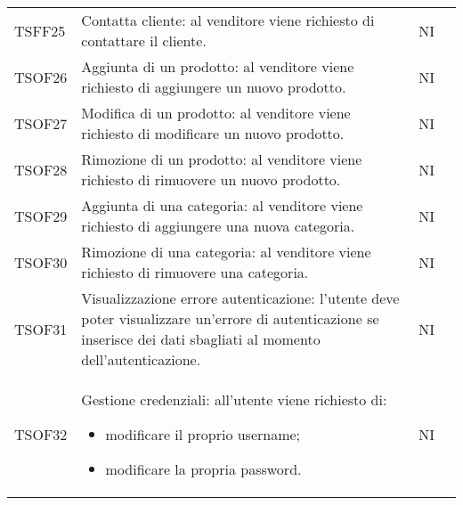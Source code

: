 \begin{center}
\begin{longtable}[!h]{p{50px} p{245px} p{75px} p{50px}}
        TSFF25                           & Contatta cliente: al venditore viene richiesto di contattare il cliente.                                                                                            & NI             \\
        TSOF26                           & Aggiunta di un prodotto: al venditore viene richiesto di aggiungere un nuovo prodotto.                                                                              & NI             \\
        TSOF27                           & Modifica di un prodotto: al venditore viene richiesto di modificare un nuovo prodotto.                                                                              & NI             \\
        TSOF28                           & Rimozione di un prodotto: al venditore viene richiesto di rimuovere un nuovo prodotto.                                                                              & NI             \\
        TSOF29                           & Aggiunta di una categoria: al venditore viene richiesto di aggiungere una nuova categoria.                                                                          & NI             \\
        TSOF30                           & Rimozione di una categoria: al venditore viene richiesto di rimuovere una categoria.                                                                                & NI             \\
        TSOF31                           & Visualizzazione errore autenticazione: l'utente deve poter visualizzare un'errore di autenticazione se inserisce dei dati sbagliati al momento dell'autenticazione. & NI             \\
        TSOF32                           & Gestione credenziali: all'utente viene richiesto di: \begin{itemize} \item modificare il proprio username; \item modificare la propria password.\end{itemize}                                                                                     & NI             \\
    \end{longtable}
\end{center}
